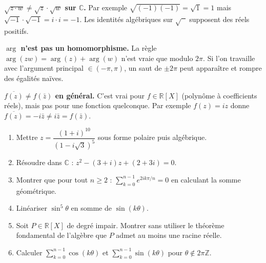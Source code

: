 \vspace{6pt}

\begin{mdframed}[style=cexbar]
  \textbf{$\sqrt{z\cdot w} \neq \sqrt{z}\cdot\sqrt{w}$ sur $\mathbb{C}$.}\enspace{}
  Par exemple $\sqrt{(-1)(-1)} = \sqrt{1} = 1$ mais
  $\sqrt{-1}\cdot\sqrt{-1} = i\cdot i = -1$.
  Les identités algébriques sur $\sqrt{\phantom{x}}$ supposent des réels positifs.

  \smallskip\noindent
  \textbf{$\arg$ n'est pas un homomorphisme.}\enspace{}
  La règle $\arg(zw)=\arg(z)+\arg(w)$ n'est vraie que modulo $2\pi$.
  Si l'on travaille avec l'argument principal $\in(-\pi,\pi)$, un saut de $\pm 2\pi$
  peut apparaître et rompre des égalités naïves.

  \smallskip\noindent
  \textbf{$\overline{f(z)} \neq f(\bar z)$ en général.}\enspace{}
  C'est vrai pour $f\in\mathbb{R}[X]$ (polynôme à coefficients réels), mais pas
  pour une fonction quelconque. Par exemple $f(z)=iz$ donne
  $\overline{f(z)} = -i\bar z \neq i\bar z = f(\bar z)$.
\end{mdframed}

\vspace{6pt}
\exolabel{}

\begin{mdframed}[style=exobar]
  \begin{enumerate}
    \item Mettre $z = \dfrac{{(1+i)}^{10}}{{(1-i\sqrt{3})}^5}$ sous forme polaire puis algébrique.

    \item Résoudre dans $\mathbb{C}$ : $z^2 - (3+i)z + (2+3i) = 0$.

    \item Montrer que pour tout $n\geq 2$ :
          $\displaystyle\sum_{k=0}^{n-1} e^{2ik\pi/n} = 0$
          en calculant la somme géométrique.

    \item Linéariser $\sin^5\theta$ en somme de $\sin(k\theta)$.

    \item Soit $P\in\mathbb{R}[X]$ de degré impair. Montrer sans utiliser le
          théorème fondamental de l'algèbre que $P$ admet au moins une racine réelle.

    \item Calculer $\displaystyle\sum_{k=0}^{n-1}\cos(k\theta)$ et
          $\displaystyle\sum_{k=0}^{n-1}\sin(k\theta)$ pour $\theta \notin 2\pi\mathbb{Z}$.
  \end{enumerate}
\end{mdframed}

